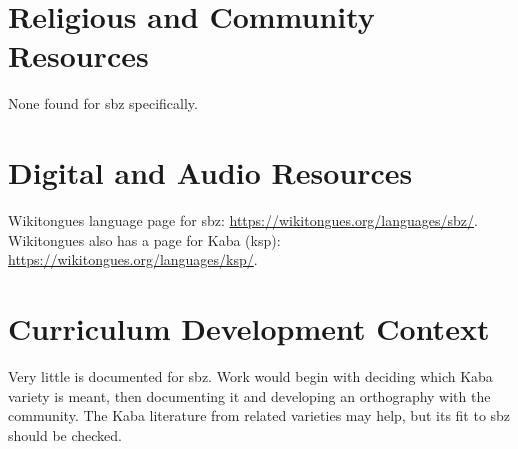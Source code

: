 \documentclass[12pt]{article}
\begin{document}
\section{Religious and Community Resources}
None found for sbz specifically.

\section{Digital and Audio Resources}
Wikitongues language page for sbz: \url{https://wikitongues.org/languages/sbz/}. Wikitongues also has a page for Kaba (ksp): \url{https://wikitongues.org/languages/ksp/}.

\section{Curriculum Development Context}
Very little is documented for sbz. Work would begin with deciding which Kaba variety is meant, then documenting it and developing an orthography with the community. The Kaba literature from related varieties may help, but its fit to sbz should be checked.
\end{document}
